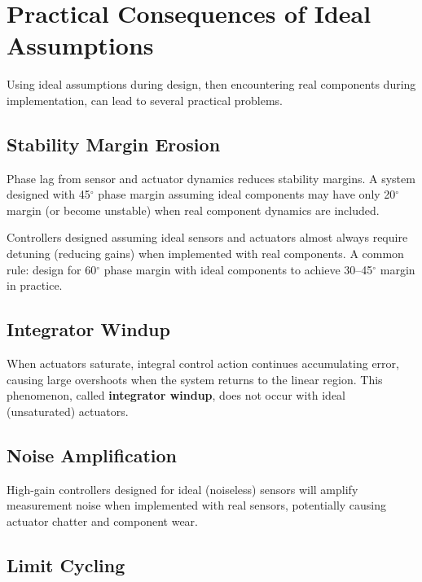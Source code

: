 \section{Practical Consequences of Ideal Assumptions}
\label{sec:practical_consequences}

Using ideal assumptions during design, then encountering real components during implementation, can lead to several practical problems.

\subsection{Stability Margin Erosion}

Phase lag from sensor and actuator dynamics reduces stability margins. A system designed with 45$^\circ$ phase margin assuming ideal components may have only 20$^\circ$ margin (or become unstable) when real component dynamics are included.

\begin{warningbox}
Controllers designed assuming ideal sensors and actuators almost always require detuning (reducing gains) when implemented with real components. A common rule: design for 60$^\circ$ phase margin with ideal components to achieve 30--45$^\circ$ margin in practice.
\end{warningbox}

\subsection{Integrator Windup}

When actuators saturate, integral control action continues accumulating error, causing large overshoots when the system returns to the linear region. This phenomenon, called \textbf{integrator windup}, does not occur with ideal (unsaturated) actuators.

\subsection{Noise Amplification}

High-gain controllers designed for ideal (noiseless) sensors will amplify measurement noise when implemented with real sensors, potentially causing actuator chatter and component wear.

\subsection{Limit Cycling}

